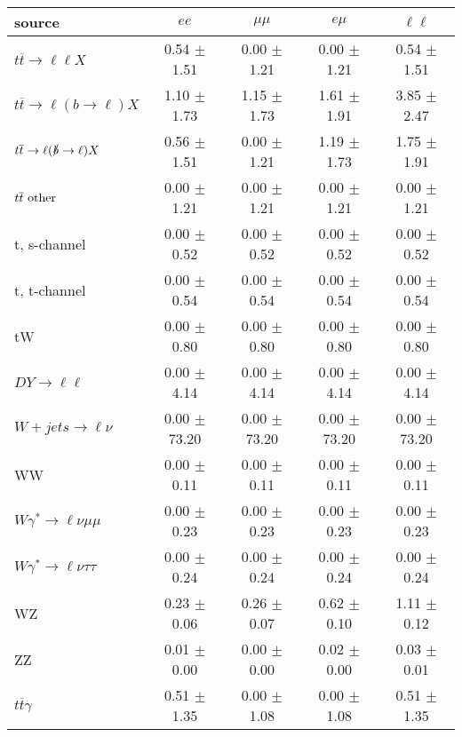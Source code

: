 \begin{tabular}{l|cccc} \hline\hline
source & $ee$ & $\mu\mu$ & $e\mu$ & $\ell\ell $ \\
\hline
$t\overline{t} \rightarrow \ell \ell X$ &  0.54 $\pm$  1.51 &  0.00 $\pm$  1.21 &  0.00 $\pm$  1.21 &  0.54 $\pm$  1.51 \\
$t\overline{t} \rightarrow \ell (b \rightarrow \ell) X$ &  1.10 $\pm$  1.73 &  1.15 $\pm$  1.73 &  1.61 $\pm$  1.91 &  3.85 $\pm$  2.47 \\
$t\overline{t} \rightarrow \ell (\slashed b \rightarrow \ell) X$ &  0.56 $\pm$  1.51 &  0.00 $\pm$  1.21 &  1.19 $\pm$  1.73 &  1.75 $\pm$  1.91 \\
        $t\overline{t}\ \rm{other}$ &  0.00 $\pm$  1.21 &  0.00 $\pm$  1.21 &  0.00 $\pm$  1.21 &  0.00 $\pm$  1.21 \\
\hline
                       t, s-channel &  0.00 $\pm$  0.52 &  0.00 $\pm$  0.52 &  0.00 $\pm$  0.52 &  0.00 $\pm$  0.52 \\
                       t, t-channel &  0.00 $\pm$  0.54 &  0.00 $\pm$  0.54 &  0.00 $\pm$  0.54 &  0.00 $\pm$  0.54 \\
                                 tW &  0.00 $\pm$  0.80 &  0.00 $\pm$  0.80 &  0.00 $\pm$  0.80 &  0.00 $\pm$  0.80 \\
\hline
         $DY \rightarrow \ell \ell$ &  0.00 $\pm$  4.14 &  0.00 $\pm$  4.14 &  0.00 $\pm$  4.14 &  0.00 $\pm$  4.14 \\
      $W+jets \rightarrow \ell \nu$ &  0.00 $\pm$ 73.20 &  0.00 $\pm$ 73.20 &  0.00 $\pm$ 73.20 &  0.00 $\pm$ 73.20 \\
                                 WW &  0.00 $\pm$  0.11 &  0.00 $\pm$  0.11 &  0.00 $\pm$  0.11 &  0.00 $\pm$  0.11 \\
\hline
$W\gamma^{*} \rightarrow \ell \nu \mu\mu$ &  0.00 $\pm$  0.23 &  0.00 $\pm$  0.23 &  0.00 $\pm$  0.23 &  0.00 $\pm$  0.23 \\
$W\gamma^{*} \rightarrow \ell \nu \tau\tau$ &  0.00 $\pm$  0.24 &  0.00 $\pm$  0.24 &  0.00 $\pm$  0.24 &  0.00 $\pm$  0.24 \\
                                 WZ &  0.23 $\pm$  0.06 &  0.26 $\pm$  0.07 &  0.62 $\pm$  0.10 &  1.11 $\pm$  0.12 \\
                                 ZZ &  0.01 $\pm$  0.00 &  0.00 $\pm$  0.00 &  0.02 $\pm$  0.00 &  0.03 $\pm$  0.01 \\
\hline
              $t\overline{t}\gamma$ &  0.51 $\pm$  1.35 &  0.00 $\pm$  1.08 &  0.00 $\pm$  1.08 &  0.51 $\pm$  1.35 \\

\end{tabular}
